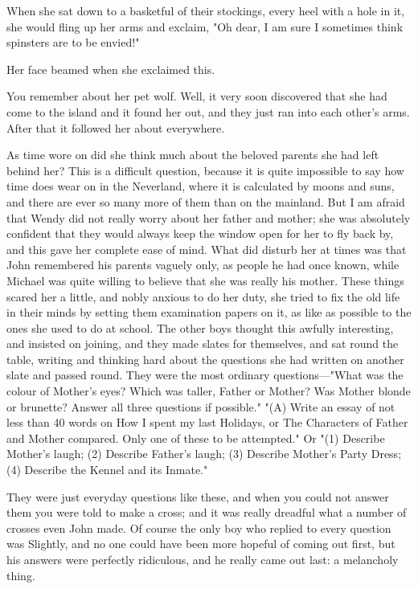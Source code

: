 When she sat down to a basketful of their stockings, every heel with a hole in it, she would fling up her arms and exclaim, "Oh dear, I am sure I sometimes think spinsters are to be envied!"

Her face beamed when she exclaimed this.

You remember about her pet wolf.
Well, it very soon discovered that she had come to the island and it found her out, and they just ran into each other's arms.
After that it followed her about everywhere.

As time wore on did she think much about the beloved parents she had left behind her?
This is a difficult question, because it is quite impossible to say how time does wear on in the Neverland, where it is calculated by moons and suns, and there are ever so many more of them than on the mainland.
But I am afraid that Wendy did not really worry about her father and mother;
she was absolutely confident that they would always keep the window open for her to fly back by, and this gave her complete ease of mind.
What did disturb her at times was that John remembered his parents vaguely only, as people he had once known, while Michael was quite willing to believe that she was really his mother.
These things scared her a little, and nobly anxious to do her duty, she tried to fix the old life in their minds by setting them examination papers on it, as like as possible to the ones she used to do at school.
The other boys thought this awfully interesting, and insisted on joining, and they made slates for themselves, and sat round the table, writing and thinking hard about the questions she had written on another slate and passed round.
They were the most ordinary questions—"What was the colour of Mother's eyes?
Which was taller, Father or Mother?
Was Mother blonde or brunette?
Answer all three questions if possible."
"(A) Write an essay of not less than 40 words on How I spent my last Holidays, or The Characters of Father and Mother compared.
Only one of these to be attempted."
Or "(1) Describe Mother's laugh;
(2) Describe Father's laugh;
(3) Describe Mother's Party Dress;
(4) Describe the Kennel and its Inmate."

They were just everyday questions like these, and when you could not answer them you were told to make a cross;
and it was really dreadful what a number of crosses even John made.
Of course the only boy who replied to every question was Slightly, and no one could have been more hopeful of coming out first, but his answers were perfectly ridiculous, and he really came out last:
a melancholy thing.

